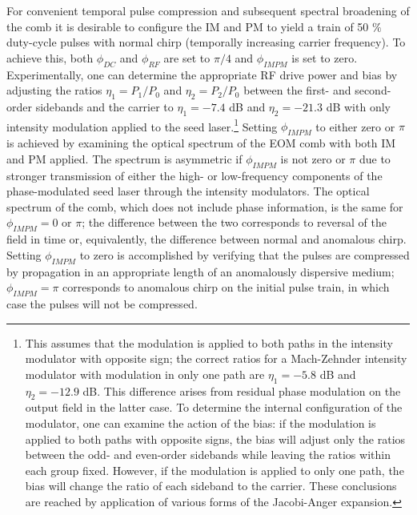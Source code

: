 For convenient temporal pulse compression and subsequent spectral broadening of the comb it is desirable to configure the IM and PM to yield a train of 50 $\%$ duty-cycle pulses with normal chirp (temporally increasing carrier frequency). To achieve this, both $\phi_{DC}$ and $\phi_{RF}$ are set to $\pi/4$ and $\phi_{IMPM}$ is set to zero. Experimentally, one can determine the appropriate RF drive power and bias by adjusting the ratios $\eta_1=P_1/P_0$ and $\eta_2=P_2/P_0$ between the first- and second-order sidebands and the carrier to $\eta_1=-7.4$ dB and $\eta_2=-21.3$ dB with only intensity modulation applied to the seed laser.\footnote{This assumes that the modulation is applied to both paths in the intensity modulator with opposite sign; the correct ratios for a Mach-Zehnder intensity modulator with modulation in only one path are $\eta_1=-5.8$ dB and $\eta_2=-12.9$ dB. This difference arises from residual phase modulation on the output field in the latter case. To determine the internal configuration of the modulator, one can examine the action of the bias: if the modulation is applied to both paths with opposite signs, the bias will adjust only the ratios between the odd- and even-order sidebands while leaving the ratios within each group fixed. However, if the modulation is applied to only one path, the bias will change the ratio of each sideband to the carrier. These conclusions are reached by application of various forms of the Jacobi-Anger expansion.} Setting $\phi_{IMPM}$ to either zero or $\pi$ is achieved by examining the optical spectrum of the EOM comb with both IM and PM applied. The spectrum is asymmetric if $\phi_{IMPM}$ is not zero or $\pi$ due to stronger transmission of either the high- or low-frequency components of the phase-modulated seed laser through the intensity modulators. The optical spectrum of the comb, which does not include phase information, is the same for $\phi_{IMPM}=0$ or $\pi$; the difference between the two corresponds to reversal of the field in time or, equivalently, the difference between normal and anomalous chirp. Setting $\phi_{IMPM}$ to zero is accomplished by verifying that the pulses are compressed by propagation in an appropriate length of an anomalously dispersive medium; $\phi_{IMPM}=\pi$ corresponds to anomalous chirp on the initial pulse train, in which case the pulses will not be compressed.

